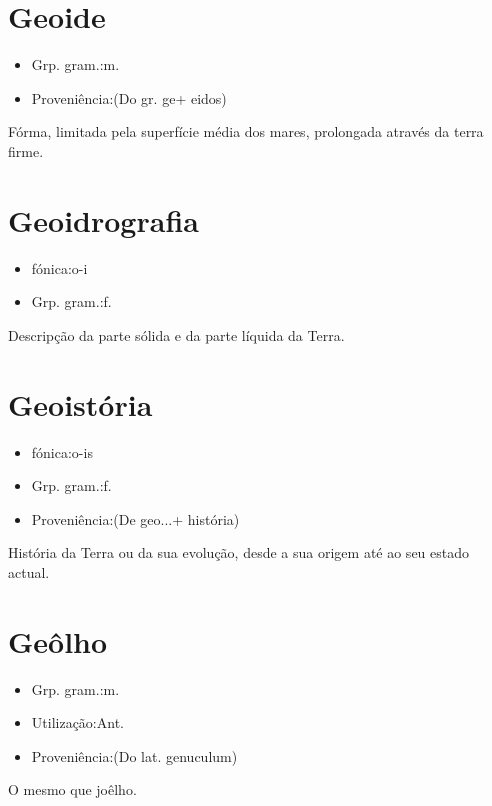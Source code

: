 \section{Geoide}
\begin{itemize}
\item {Grp. gram.:m.}
\end{itemize}
\begin{itemize}
\item {Proveniência:(Do gr. \textunderscore ge\textunderscore  + \textunderscore eidos\textunderscore )}
\end{itemize}
Fórma, limitada pela superfície média dos mares, prolongada através da terra firme.
\section{Geoidrografia}
\begin{itemize}
\item {fónica:o-i}
\end{itemize}
\begin{itemize}
\item {Grp. gram.:f.}
\end{itemize}
Descripção da parte sólida e da parte líquida da Terra.
\section{Geoistória}
\begin{itemize}
\item {fónica:o-is}
\end{itemize}
\begin{itemize}
\item {Grp. gram.:f.}
\end{itemize}
\begin{itemize}
\item {Proveniência:(De \textunderscore geo...\textunderscore  + \textunderscore história\textunderscore )}
\end{itemize}
História da Terra ou da sua evolução, desde a sua origem até ao seu estado actual.
\section{Geôlho}
\begin{itemize}
\item {Grp. gram.:m.}
\end{itemize}
\begin{itemize}
\item {Utilização:Ant.}
\end{itemize}
\begin{itemize}
\item {Proveniência:(Do lat. \textunderscore genuculum\textunderscore )}
\end{itemize}
O mesmo que \textunderscore joêlho\textunderscore .

